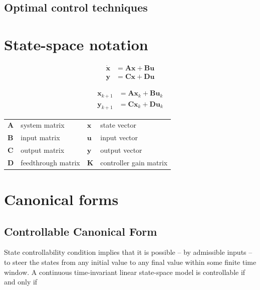 \documentclass[10pt,conference,compsoc]{IEEEtran}
\newcommand{\mtx}[1] {\bm #1}
\begin{document}
\subsection{Optimal control techniques}

\section{State-space notation}

\begin{align}
  \dot{\mtx{x}} &= \mtx{A}\mtx{x} + \mtx{B}\mtx{u} \label{eq:s_ctrl_x} \\
  \mtx{y} &= \mtx{C}\mtx{x} + \mtx{D}\mtx{u} \label{eq:s_ctrl_y}
\end{align}

\begin{align}
  \mtx{x}_{k+1} &= \mtx{A}\mtx{x}_k + \mtx{B}\mtx{u}_k \label{eq:z_ctrl_x} \\
  \mtx{y}_{k+1} &= \mtx{C}\mtx{x}_k + \mtx{D}\mtx{u}_k \label{eq:z_ctrl_y}
\end{align}

\begin{table}[ht]
  \renewcommand{\arraystretch}{1.3}
  \centering
  \begin{tabular}{llll}
    $\mtx{A}$ & system matrix      & $\mtx{x}$ & state vector \\
    $\mtx{B}$ & input matrix       & $\mtx{u}$ & input vector \\
    $\mtx{C}$ & output matrix      & $\mtx{y}$ & output vector \\
    $\mtx{D}$ & feedthrough matrix & $\mtx{K}$ & controller gain matrix \\
  \end{tabular}
  \label{tab:ctrl_def}
\end{table}

\section{Canonical forms}

\subsection{Controllable Canonical Form}

\noindent State controllability condition implies that it is possible --
by admissible inputs -- to steer the states from any initial value to any final
value within some finite time window. A continuous time-invariant linear
state-space model is controllable if and only if
\end{document}
